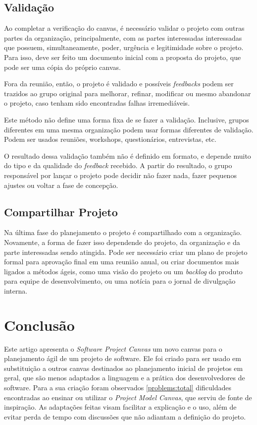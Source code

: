 \documentclass[a4]{report}
\begin{document}
\subsection{Validação}

Ao completar a verificação do canvas, é necessário validar o projeto com outras partes da organização, principalmente, com as partes interessadas interessadas que possuem, simultaneamente, poder, urgência e legitimidade sobre o projeto\cite{mitchell_toward_1997}. Para isso, deve ser feito um documento inicial com a proposta do projeto, que pode ser uma cópia do próprio canvas.

Fora da reunião, então, o projeto é validado e possíveis \textit{feedbacks} podem ser trazidos ao grupo original para melhorar, refinar, modificar ou mesmo abandonar o projeto, caso tenham sido encontradas falhas irremediáveis.


Este método não define uma forma fixa de se fazer a validação. Inclusive, grupos diferentes em uma mesma organização podem usar formas diferentes de validação. Podem ser usados reuniões, workshops, questionários, entrevistas, etc.

O resultado dessa validação também não é definido em formato, e depende muito do tipo e da qualidade do \textit{feedback} recebido. A partir do resultado, o grupo responsável por lançar o projeto pode decidir não fazer nada, fazer pequenos ajustes ou voltar a fase de concepção.

\subsection{Compartilhar Projeto}

Na última fase do planejamento o projeto é compartilhado com a organização. Novamente, a forma de fazer isso dependende do projeto, da organização e da parte interessadas sendo atingida.  Pode ser necessário criar um plano de projeto formal para aprovação final em uma reunião anual, ou criar documentos mais ligados a métodos ágeis, como uma  visão do projeto ou um \textit{backlog} do produto para equipe de desenvolvimento, ou uma notícia para o jornal de divulgação interna.






\section{Conclusão}

Este artigo apresenta o \textit{Software Project Canvas} um novo canvas para o planejamento ágil de um projeto de software. Ele foi criado para ser usado em substituição a outros canvas destinados ao planejamento inicial de projetos em geral, que são menos adaptados a linguagem e a prática dos desenvolvedores de software. Para a sua  criação foram observados \ref{problems:total} dificuldades encontradas ao ensinar ou utilizar o \textit{Project Model Canvas}, que serviu de fonte de inspiração. As adaptações feitas visam facilitar a explicação e o uso, além de evitar perda de tempo com discussões que não adiantam a definição do projeto.
\end{document}
